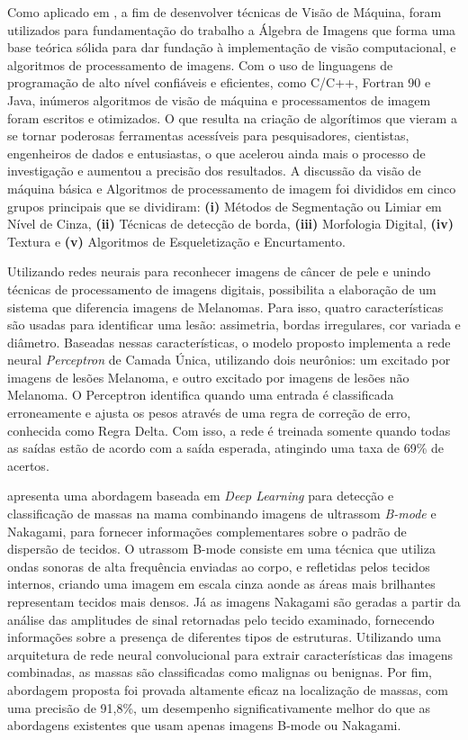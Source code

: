 Como aplicado em , a fim de desenvolver técnicas de Visão de Máquina, foram utilizados para fundamentação do trabalho a Álgebra de Imagens que forma uma base teórica sólida para dar fundação à implementação de visão computacional, e algoritmos de processamento de imagens. Com o uso de linguagens de programação de alto nível confiáveis e eficientes, como C/C++,
Fortran 90 e Java, inúmeros algoritmos de visão de máquina e processamentos de imagem foram escritos e otimizados. O que resulta na criação de algorítimos que vieram a se tornar poderosas ferramentas acessíveis para pesquisadores, cientistas, engenheiros de dados e entusiastas, o que acelerou ainda mais o processo de investigação e aumentou a precisão dos resultados.
A discussão da visão de máquina básica e Algoritmos de processamento de imagem foi divididos em cinco grupos principais que se dividiram: \textbf{(i)} Métodos de Segmentação ou Limiar em Nível de Cinza, \textbf{(ii)} Técnicas de detecção de borda, \textbf{(iii)} Morfologia Digital, \textbf{(iv)} Textura e \textbf{(v)} Algoritmos de Esqueletização e Encurtamento.

Utilizando redes neurais para reconhecer imagens de câncer de pele e unindo técnicas de processamento de imagens digitais,  possibilita a elaboração de um sistema que diferencia imagens de Melanomas. Para isso, quatro características são usadas para identificar uma lesão: assimetria, bordas irregulares, cor variada e diâmetro. Baseadas nessas características, o modelo proposto implementa a rede neural \textit{Perceptron} de Camada Única, utilizando dois neurônios: um excitado por imagens de lesões Melanoma, e outro excitado por imagens de lesões não Melanoma. O Perceptron identifica quando uma entrada é classificada erroneamente e ajusta os pesos através de uma regra de correção de erro, conhecida como Regra Delta. Com isso, a rede é treinada somente quando todas as saídas estão de acordo com a saída esperada, atingindo uma taxa de 69\% de acertos.

 apresenta uma abordagem baseada em \textit{Deep Learning} para detecção e classificação de massas na mama combinando imagens de ultrassom \textit{B-mode} e Nakagami, para fornecer informações complementares sobre o padrão de dispersão de tecidos. O utrassom B-mode consiste em uma técnica que utiliza ondas sonoras de alta frequência enviadas ao corpo, e refletidas pelos tecidos internos, criando uma imagem em escala cinza aonde as áreas mais brilhantes representam tecidos mais densos. Já as imagens Nakagami são geradas a partir da análise das amplitudes de sinal retornadas pelo tecido examinado, fornecendo informações sobre a presença de diferentes tipos de estruturas. Utilizando uma arquitetura de rede neural convolucional para extrair características das imagens combinadas, as massas são classificadas como malignas ou benignas. Por fim, abordagem proposta foi provada altamente eficaz na localização de massas, com uma precisão de 91,8\%, um desempenho significativamente melhor do que as abordagens existentes que usam apenas imagens B-mode ou Nakagami.

